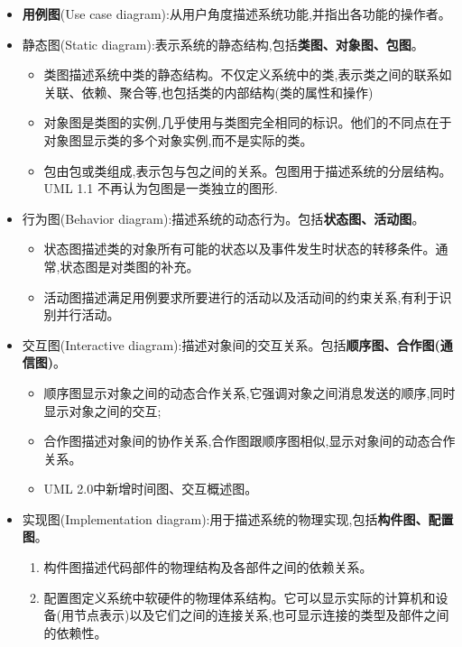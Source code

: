 \documentclass[../main.tex]{subfiles}
\begin{document}
\begin{itemize}
  \item \textbf{用例图}(Use case diagram):从用户角度描述系统功能,并指出各功能的操作者。
  \item 静态图(Static diagram):表示系统的静态结构,包括\textbf{类图、对象图、包图}。
    \begin{itemize}
      \item 类图描述系统中类的静态结构。不仅定义系统中的类,表示类之间的联系如关联、依赖、聚合等,也包括类的内部结构(类的属性和操作)
      \item 对象图是类图的实例,几乎使用与类图完全相同的标识。他们的不同点在于对象图显示类的多个对象实例,而不是实际的类。
      \item 包由包或类组成,表示包与包之间的关系。包图用于描述系统的分层结构。UML
        1.1 不再认为包图是一类独立的图形.
    \end{itemize}
  \item 行为图(Behavior diagram):描述系统的动态行为。包括\textbf{状态图、活动图}。
    \begin{itemize}
      \item 状态图描述类的对象所有可能的状态以及事件发生时状态的转移条件。通常,状态图是对类图的补充。
      \item 活动图描述满足用例要求所要进行的活动以及活动间的约束关系,有利于识别并行活动。
    \end{itemize}
  \item 交互图(Interactive diagram):描述对象间的交互关系。包括\textbf{顺序图、合作图(通信图)}。
    \begin{itemize}
      \item 顺序图显示对象之间的动态合作关系,它强调对象之间消息发送的顺序,同时显示对象之间的交互;
      \item 合作图描述对象间的协作关系,合作图跟顺序图相似,显示对象间的动态合作关系。
      \item UML 2.0中新增时间图、交互概述图。
    \end{itemize}
  \item 实现图(Implementation diagram):用于描述系统的物理实现,包括\textbf{构件图、配置图}。
    \begin{enumerate}
      \item 构件图描述代码部件的物理结构及各部件之间的依赖关系。
      \item 配置图定义系统中软硬件的物理体系结构。它可以显示实际的计算机和设备(用节点表示)以及它们之间的连接关系,也可显示连接的类型及部件之间的依赖性。
    \end{enumerate}
\end{itemize}
\end{document}
